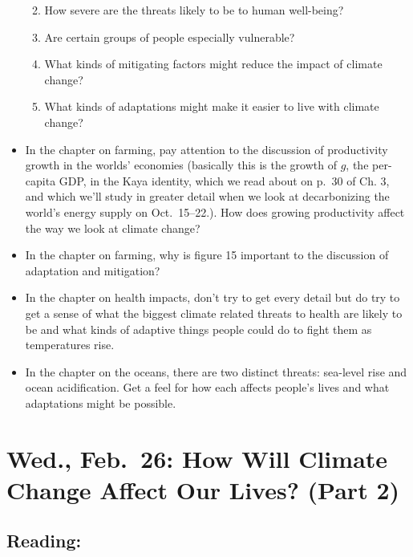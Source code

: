 \documentclass[
]{article}
\providecommand{\tightlist}{%
  \setlength{\itemsep}{0pt}\setlength{\parskip}{0pt}}
\begin{document}
\begin{itemize}
  \begin{enumerate}
  \def\labelenumi{\arabic{enumi}.}
  \tightlist
  \item
    How severe are the threats likely to be to human well-being?
  \item
    Are certain groups of people especially vulnerable?
  \item
    What kinds of mitigating factors might reduce the impact of climate
    change?
  \item
    What kinds of adaptations might make it easier to live with climate
    change?
  \end{enumerate}
\item
  In the chapter on farming, pay attention to the discussion of
  productivity growth in the worlds' economies (basically this is the
  growth of \(g\), the per-capita GDP, in the Kaya identity, which we
  read about on p.~30 of Ch. 3, and which we'll study in greater detail
  when we look at decarbonizing the world's energy supply on
  Oct.~15--22.). How does growing productivity affect the way we look at
  climate change?
\item
  In the chapter on farming, why is figure 15 important to the
  discussion of adaptation and mitigation?
\item
  In the chapter on health impacts, don't try to get every detail but do
  try to get a sense of what the biggest climate related threats to
  health are likely to be and what kinds of adaptive things people could
  do to fight them as temperatures rise.
\item
  In the chapter on the oceans, there are two distinct threats:
  sea-level rise and ocean acidification. Get a feel for how each
  affects people's lives and what adaptations might be possible.
\end{itemize}

\hypertarget{wed.-feb.-26-how-will-climate-change-affect-our-lives-part-2}{%
\section{Wed., Feb.~26: How Will Climate Change Affect Our Lives? (Part
2)}\label{wed.-feb.-26-how-will-climate-change-affect-our-lives-part-2}}

\hypertarget{reading-21}{%
\subsection{Reading:}\label{reading-21}}
\end{document}

